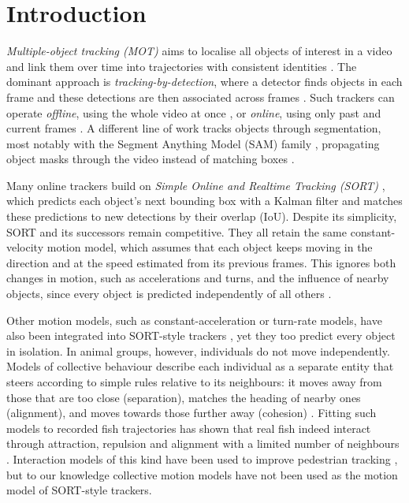 \documentclass[9pt,twoside]{pnas-new}
\begin{document}

\section*{Introduction}
\emph{Multiple-object tracking (MOT)} aims to localise all objects of interest in a video and link them over time into trajectories with consistent identities \cite{mot_survey}. 
The dominant approach is \emph{tracking-by-detection}, where a detector finds objects in each frame and these detections are then associated across frames \cite{mot_survey,motchallenge}.
Such trackers can operate \emph{offline}, using the whole video at once \cite{neuralsolver}, or \emph{online}, using only past and current frames \cite{sort,deepsort,bytetrack,ocsort}.
A different line of work tracks objects through segmentation, most notably with the Segment Anything Model (SAM) family \cite{sam2,sam3}, propagating object masks through the video instead of matching boxes \cite{ugo}.

Many online trackers build on \emph{Simple Online and Realtime Tracking (SORT)} \cite{sort}, which predicts each object's next bounding box with a Kalman filter \cite{kalman} and matches these predictions to new detections by their overlap (IoU).
Despite its simplicity, SORT and its successors \cite{deepsort,bytetrack,ocsort,oasort} remain competitive.
They all retain the same constant-velocity motion model, which assumes that each object keeps moving in the direction and at the speed estimated from its previous frames.
This ignores both changes in motion, such as accelerations and turns, and the influence of nearby objects, since every object is predicted independently of all others \cite{sort}.

Other motion models, such as constant-acceleration or turn-rate models, have also been integrated into SORT-style trackers \cite{fish_ekf,arcsort}, yet they too predict every object in isolation.
In animal groups, however, individuals do not move independently.
Models of collective behaviour describe each individual as a separate entity that steers according to simple rules relative to its neighbours: it moves away from those that are too close (separation), matches the heading of nearby ones (alignment), and moves towards those further away (cohesion) \cite{aoki,reynolds,couzin}.
Fitting such models to recorded fish trajectories has shown that real fish indeed interact through attraction, repulsion and alignment with a limited number of neighbours \cite{katz,heras}.
Interaction models of this kind have been used to improve pedestrian tracking \cite{pedestrians}, but to our knowledge collective motion models have not been used as the motion model of SORT-style trackers.
\end{document}
